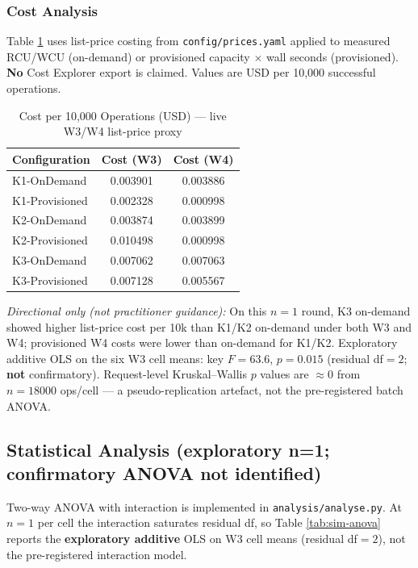\subsubsection{Cost Analysis}

Table \ref{tab:sim-cost} uses list-price costing from \texttt{config/prices.yaml} applied to measured RCU/WCU (on-demand) or provisioned capacity $\times$ wall seconds (provisioned). \textbf{No} Cost Explorer export is claimed. Values are USD per 10{,}000 successful operations.

\begin{table}[h]
\centering
\caption{Cost per 10,000 Operations (USD) --- live W3/W4 list-price proxy}
\label{tab:sim-cost}
\begin{tabular}{|l|c|c|}
\hline
\textbf{Configuration} & \textbf{Cost (W3)} & \textbf{Cost (W4)} \\ \hline
K1-OnDemand & 0.003901 & 0.003886 \\ \hline
K1-Provisioned & 0.002328 & 0.000998 \\ \hline
K2-OnDemand & 0.003874 & 0.003899 \\ \hline
K2-Provisioned & 0.010498 & 0.000998 \\ \hline
K3-OnDemand & 0.007062 & 0.007063 \\ \hline
K3-Provisioned & 0.007128 & 0.005567 \\ \hline
\end{tabular}
\end{table}

\textit{Directional only (not practitioner guidance):} On this $n{=}1$ round, K3 on-demand showed higher list-price cost per 10k than K1/K2 on-demand under both W3 and W4; provisioned W4 costs were lower than on-demand for K1/K2. Exploratory additive OLS on the six W3 cell means: key $F{=}63.6$, $p{=}0.015$ (residual df${=}2$; \textbf{not} confirmatory). Request-level Kruskal--Wallis $p$ values are $\approx 0$ from $n{=}18000$ ops/cell --- a pseudo-replication artefact, not the pre-registered batch ANOVA.

\subsection{Statistical Analysis (exploratory n=1; confirmatory ANOVA not identified)}

Two-way ANOVA with interaction is implemented in \texttt{analysis/analyse.py}. At $n{=}1$ per cell the interaction saturates residual df, so Table \ref{tab:sim-anova} reports the \textbf{exploratory additive} OLS on W3 cell means (residual df${=}2$), not the pre-registered interaction model.

